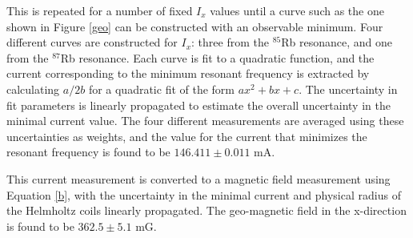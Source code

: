 This is repeated for a number of fixed $I_x$ values until a curve such as the one shown in Figure \ref{geo} can be constructed with an observable minimum. Four different curves are constructed for $I_x$: three from the $^{85}$Rb resonance, and one from the $^{87}$Rb resonance. Each curve is fit to a quadratic function, and the current corresponding to the minimum resonant frequency is extracted by calculating $a/2b$ for a quadratic fit of the form $ax^2+bx+c$. The uncertainty in fit parameters is linearly propagated to estimate the overall uncertainty in the minimal current value. The four different measurements are averaged using these uncertainties as weights, and the value for the current that minimizes the resonant frequency is found to be $146.411\pm0.011$ mA.

This current measurement is converted to a magnetic field measurement using Equation \ref{b}, with the uncertainty in the minimal current and physical radius of the Helmholtz coils linearly propagated. The geo-magnetic field in the x-direction is found to be $362.5\pm 5.1$ mG. 

